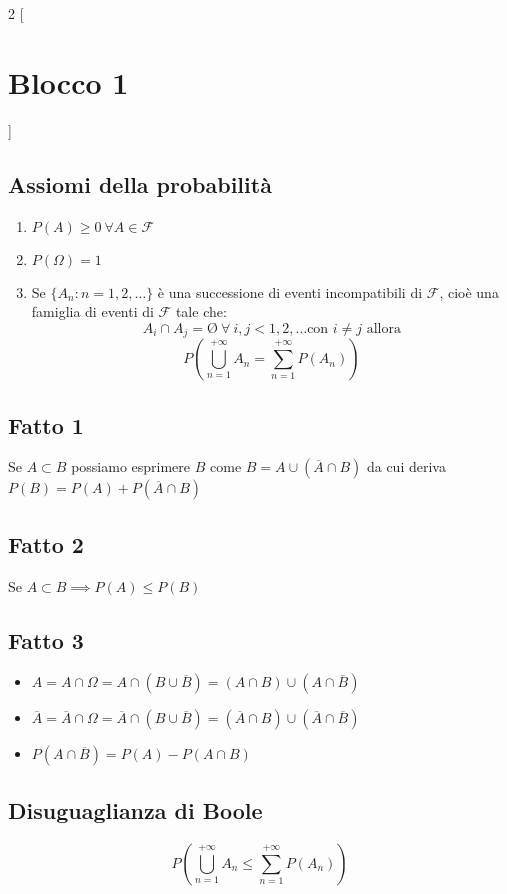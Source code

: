 \begin{multicols*}{2}
[\section*{Blocco 1}]

\subsection*{Assiomi della probabilità}
\begin{enumerate}
    \item $P(A) \ge 0 \ \forall A \in \mathscr{F}$
    \item $P(\Omega) = 1$
    \item Se $\{A_n: n = 1,2,\dots\}$ è una successione di eventi
    incompatibili di $\mathscr{F}$, cioè una famiglia di eventi di $\mathscr{F}$ tale che:
    $$A_i \cap A_j = \text{\O} \ \forall \ i,j < 1,2,\dots \text{con } i \neq j \text{ allora}$$
    $$P \left(\bigcup^{+\infty}_{n=1} A_n = \sum_{n=1}^{+\infty}P(A_n)\right)$$
\end{enumerate}

\subsection*{Fatto 1}
Se $A \subset B$ possiamo esprimere $B$ come $B = A\cup (\overline{A} \cap B)$ 
da cui deriva $P(B) = P(A) + P(\overline{A} \cap B)$

\subsection*{Fatto 2}
Se $A \subset B \implies P(A) \le P(B)$

\subsection*{Fatto 3}
\begin{itemize}
    \item $A = A \cap \Omega = A \cap (B \cup \overline{B}) = (A \cap B) \cup (A \cap \overline{B})$
    \item $\overline{A} = \overline{A} \cap \Omega = \overline{A} \cap (B \cup \overline{B}) = (\overline{A} \cap B) \cup (\overline{A} \cap \overline{B})$
    \item $P(A \cap \overline{B}) = P(A) - P(A \cap B)$
\end{itemize}

\subsection*{Disuguaglianza di Boole}
$$P \left(\bigcup^{+\infty}_{n=1} A_n \le \sum_{n=1}^{+\infty}P(A_n)\right)$$


\end{multicols*}
